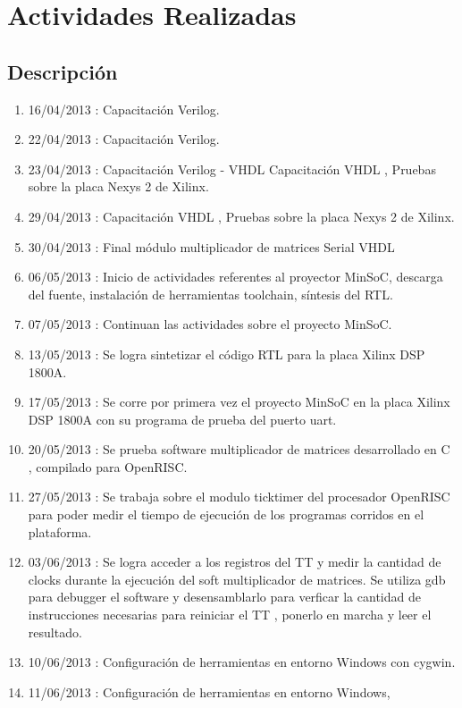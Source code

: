 \documentclass[12pt,a4paper]{article}
\begin{document}
\section{Actividades Realizadas}
\subsection{Descripción}

\begin{enumerate}
  \item 16/04/2013 : Capacitación Verilog.
  \item 22/04/2013 : Capacitación Verilog.
  \item 23/04/2013 : Capacitación Verilog - VHDL Capacitación VHDL , Pruebas
  sobre la placa Nexys 2 de Xilinx.
  \item 29/04/2013 : Capacitación VHDL , Pruebas sobre la placa Nexys 2 de
  Xilinx.
  \item 30/04/2013 : Final módulo multiplicador de matrices Serial VHDL
  \item 06/05/2013 : Inicio de actividades referentes al proyector MinSoC,
  descarga del fuente, instalación de herramientas toolchain, síntesis del RTL.
  \item 07/05/2013 : Continuan las actividades sobre el proyecto MinSoC.
  \item 13/05/2013 : Se logra sintetizar el código RTL para la placa Xilinx DSP
  1800A.
  \item 17/05/2013 : Se corre por primera vez el proyecto MinSoC en la placa
  Xilinx DSP 1800A con su programa de prueba del puerto uart.
  \item 20/05/2013 : Se prueba software multiplicador de matrices desarrollado
  en C , compilado para OpenRISC.
  \item 27/05/2013 : Se trabaja sobre el modulo ticktimer del procesador
  OpenRISC para poder medir el tiempo de ejecución de los programas corridos en
  el plataforma.
  \item 03/06/2013 : Se logra acceder a los registros del TT y medir la
  cantidad de clocks durante la ejecución del soft multiplicador de matrices. Se
  utiliza gdb para debugger el software y desensamblarlo para verficar la
  cantidad de instrucciones necesarias para reiniciar el TT , ponerlo en marcha
  y leer el resultado.
  \item 10/06/2013 : Configuración de herramientas en entorno Windows con
  cygwin.
  \item 11/06/2013 : Configuración de herramientas en entorno Windows,

\end{enumerate}
\end{document}
